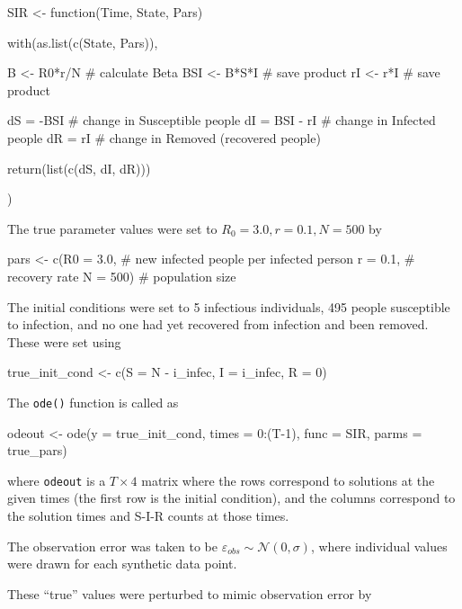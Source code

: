 \documentclass[12pt]{article}
\begin{document}
    \begin{R}    
    SIR <- function(Time, State, Pars) {

        with(as.list(c(State, Pars)), {
            
            B   <- R0*r/N    # calculate Beta
            BSI <- B*S*I     # save product
            rI  <- r*I       # save product
            
            dS = -BSI       # change in Susceptible people
            dI = BSI - rI   # change in Infected people
            dR = rI         # change in Removed (recovered people)
            
            return(list(c(dS, dI, dR)))
            
        })
        
    }
    \end{R}

    The true parameter values were set to $R_0 = 3.0, r = 0.1, N = 500$ by

    \begin{R}
    pars  <- c(R0  = 3.0,  # new infected people per infected person
              r   = 0.1,  # recovery rate
              N   = 500)  # population size
    \end{R}

    The initial conditions were set to 5 infectious individuals, 495 people susceptible to infection, and no one had yet recovered from infection and been removed. These were set using

    \begin{R}
	true_init_cond <- c(S = N - i_infec,
                	   I = i_infec,
                	   R = 0)
    \end{R}

    The \verb|ode()| function is called as

    \begin{R}
    odeout <- ode(y = true_init_cond, times = 0:(T-1), func = SIR, parms = true_pars)
    \end{R}

    where \verb|odeout| is a $T \times 4$ matrix where the rows correspond to solutions at the given times (the first row is the initial condition), and the columns correspond to the solution times and S-I-R counts at those times.

    The observation error was taken to be $\varepsilon_{obs} \sim \mathcal{N}(0,\sigma)$, where individual values were drawn for each synthetic data point.

    These ``true'' values were perturbed to mimic observation error by
\end{document}
